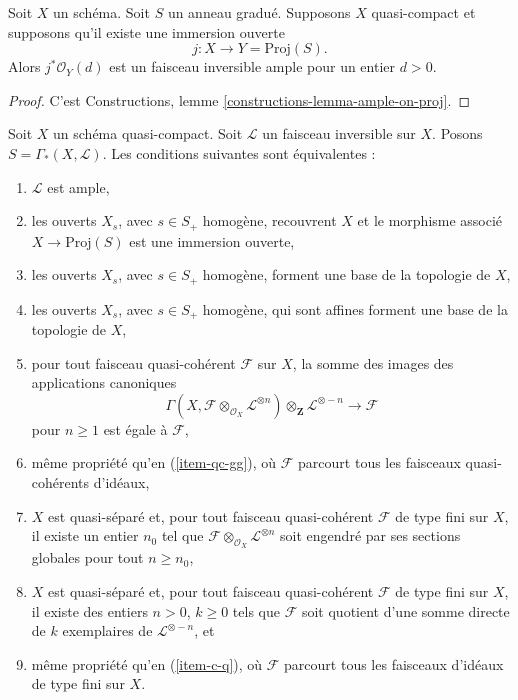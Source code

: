 \begin{lemma}
\label{lemma-open-in-proj-ample}
Soit $X$ un schéma.
Soit $S$ un anneau gradué. Supposons $X$ quasi-compact
et supposons qu'il existe une immersion ouverte
$$
j : X \longrightarrow Y = \text{Proj}(S).
$$
Alors $j^*\mathcal{O}_Y(d)$ est un faisceau inversible ample
pour un entier $d > 0$.
\end{lemma}

\begin{proof}
C'est Constructions, lemme \ref{constructions-lemma-ample-on-proj}.
\end{proof}

\begin{proposition}
\label{proposition-characterize-ample}
Soit $X$ un schéma quasi-compact.
Soit $\mathcal{L}$ un faisceau inversible sur $X$.
Posons $S = \Gamma_*(X, \mathcal{L})$.
Les conditions suivantes sont équivalentes :
\begin{enumerate}
\item
\label{item-ample}
$\mathcal{L}$ est ample,
\item
\label{item-immersion}
les ouverts $X_s$, avec $s \in S_{+}$ homogène,
recouvrent $X$ et le morphisme associé $X \to \text{Proj}(S)$
est une immersion ouverte,
\item
\label{item-s-basis}
les ouverts $X_s$, avec $s \in S_{+}$ homogène,
forment une base de la topologie de $X$,
\item
\label{item-s-affine-basis}
les ouverts $X_s$, avec $s \in S_{+}$ homogène,
qui sont affines forment une base de la topologie de $X$,
\item
\label{item-qc-gg}
pour tout faisceau quasi-cohérent $\mathcal{F}$ sur $X$,
la somme des images des applications canoniques
$$
\Gamma(X, \mathcal{F} \otimes_{\mathcal{O}_X} \mathcal{L}^{\otimes n})
\otimes_{\mathbf{Z}} \mathcal{L}^{\otimes -n}
\longrightarrow
\mathcal{F}
$$
pour $n \geq 1$ est égale à $\mathcal{F}$,
\item
\label{item-qc-i-gg}
même propriété qu'en (\ref{item-qc-gg}), où $\mathcal{F}$
parcourt tous les faisceaux quasi-cohérents d'idéaux,
\item
\label{item-c-gg}
$X$ est quasi-séparé et,
pour tout faisceau quasi-cohérent $\mathcal{F}$ de type fini sur $X$,
il existe un entier $n_0$ tel que
$\mathcal{F} \otimes_{\mathcal{O}_X} \mathcal{L}^{\otimes n}$
soit engendré par ses sections globales pour tout $n \geq n_0$,
\item
\label{item-c-q}
$X$ est quasi-séparé et,
pour tout faisceau quasi-cohérent $\mathcal{F}$ de type fini sur $X$,
il existe des entiers $n > 0$, $k \geq 0$ tels que
$\mathcal{F}$ soit quotient d'une somme directe de $k$ exemplaires de
$\mathcal{L}^{\otimes - n}$, et
\item
\label{item-c-i-q}
même propriété qu'en (\ref{item-c-q}), où $\mathcal{F}$ parcourt tous
les faisceaux d'idéaux de type fini sur $X$.
\end{enumerate}
\end{proposition}

